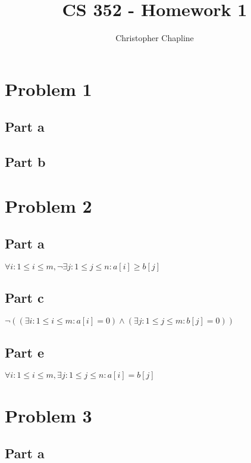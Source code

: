 \documentclass{article}%
\begin{document}
\title{CS 352 - Homework 1}
\author{Christopher Chapline}
\maketitle

\section{Problem 1}

\subsection{Part a}

\subsection{Part b}

\section{Problem 2}

\subsection{Part a}

$\forall i : 1 \leq i \leq m, \neg \exists j : 1 \leq j \leq n : a[i] \geq b[j]$

\subsection{Part c}

$\neg((\exists i : 1 \leq i \leq m : a[i] = 0) \wedge (\exists j : 1 \leq j \leq m : b[j] = 0))$

\subsection{Part e}

$\forall i : 1 \leq i \leq m, \exists j : 1 \leq j \leq n : a[i] = b[j]$

\section{Problem 3}

\subsection{Part a}
\end{document}
